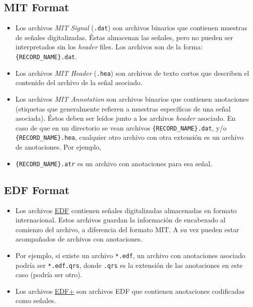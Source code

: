 \subsection*{MIT Format}
\begin{itemize}
  \item Los archivos \textit{MIT Signal} (\texttt{.dat}) son archivos binarios que contienen muestras de señales
  digitalizadas. Éstas almacenan las señales, pero no pueden ser interpretados sin los \textit{header} files.
  Los archivos son de la forma: \texttt{\{RECORD\_NAME\}.dat}.
  \item Los archivos \textit{MIT Header} (\texttt{.hea}) son archivos de texto cortos que describen el contenido
  del archivo de la señal asociado.
  \item Los archivos \textit{MIT Annotation} son archivos binarios que contienen anotaciones (etiquetas que
  generalmente refieren a muestras específicas de una señal asociada). Éstos deben ser leídos junto a los archivos
  \textit{header} asociado. En caso de que en un directorio se vean archivos \texttt{\{RECORD\_NAME\}.dat}, y/o
  \texttt{\{RECORD\_NAME\}.hea}, cualquier otro archivo con otra extensión es un archivo de anotaciones. Por ejemplo,
  \item \texttt{\{RECORD\_NAME\}.atr} es un archivo con anotaciones para esa señal.
\end{itemize}

\subsection*{EDF Format}
\begin{itemize}
  \item Los archivos \href{http://www.edfplus.info/specs/edf.html}{\underline{EDF}} contienen señales digitalizadas almacenadas en formato internacional. Estos archivos guardan la información de encabezado al comienzo del archivo, a diferencia del formato MIT. A su vez pueden estar acompañados de archivos con anotaciones.
  \item Por ejemplo, si existe un archivo \texttt{*.edf}, un archivo con anotaciones asociado podría ser \texttt{*.edf.qrs}, donde \texttt{.qrs} es la extensión de las anotaciones en este caso (podría ser otro).
  \item Los archivos \href{http://www.edfplus.info/specs/edfplus.html}{\underline{EDF+}} son archivos EDF que contienen anotaciones codificadas como señales.
\end{itemize}

